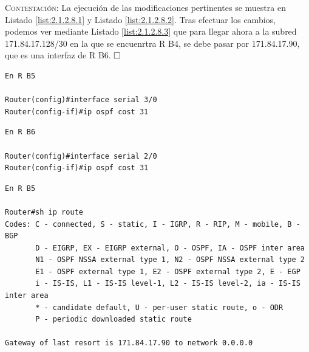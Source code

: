 \documentclass[twoside, 11pt]{article}
\begin{document}
\begin{enumerate}
\textsc{Contestación}: La ejecución de las modificaciones pertinentes se muestra en Listado \ref{list:2.1.2.8.1} y Listado \ref{list:2.1.2.8.2}. Tras efectuar los cambios, podemos ver mediante Listado \ref{list:2.1.2.8.3} que para llegar ahora a la subred 171.84.17.128/30 en la que se encuenrtra R B4, se debe pasar por 171.84.17.90, que es una interfaz de R B6. $\hfill\square$

\begin{center}
\begin{verbatim}
En R B5

Router(config)#interface serial 3/0
Router(config-if)#ip ospf cost 31
\end{verbatim}
\label{list:2.1.2.8.1}

\begin{verbatim}
En R B6

Router(config)#interface serial 2/0
Router(config-if)#ip ospf cost 31
\end{verbatim}
\label{list:2.1.2.8.2}

\begin{verbatim}
En R B5

Router#sh ip route 
Codes: C - connected, S - static, I - IGRP, R - RIP, M - mobile, B - BGP
       D - EIGRP, EX - EIGRP external, O - OSPF, IA - OSPF inter area
       N1 - OSPF NSSA external type 1, N2 - OSPF NSSA external type 2
       E1 - OSPF external type 1, E2 - OSPF external type 2, E - EGP
       i - IS-IS, L1 - IS-IS level-1, L2 - IS-IS level-2, ia - IS-IS inter area
       * - candidate default, U - per-user static route, o - ODR
       P - periodic downloaded static route

Gateway of last resort is 171.84.17.90 to network 0.0.0.0


\end{verbatim}
\end{center}
\end{enumerate}
\end{document}
